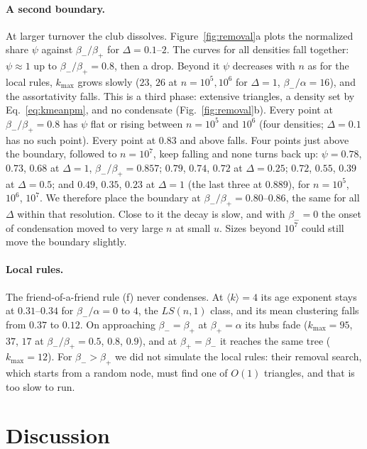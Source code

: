 \documentclass[aps,pre,twocolumn,superscriptaddress,floatfix,nofootinbib]{revtex4-2}
\begin{document}
\paragraph*{A second boundary.}
At larger turnover the club dissolves. Figure~\ref{fig:removal}a plots the
normalized share $\psi$ against $\beta_-/\beta_+$ for $\Delta=0.1$--$2$. The
curves for all densities fall together: $\psi\approx1$ up to
$\beta_-/\beta_+=0.8$, then a drop. Beyond it $\psi$
decreases with $n$ as for the local rules, $k_{\max}$ grows slowly ($23$, $26$
at $n=10^5,10^6$ for $\Delta=1$, $\beta_-/\alpha=16$), and the assortativity
falls. This is a third phase: extensive triangles, a density set by
Eq.~\eqref{eq:kmeanpm}, and no condensate (Fig.~\ref{fig:removal}b). Every point at $\beta_-/\beta_+=0.8$ has $\psi$ flat or rising
between $n=10^5$ and $10^6$ (four densities; $\Delta=0.1$ has no such point). Every point at $0.83$ and
above falls. Four points just above the boundary, followed to $n=10^7$, keep
falling and none turns back up: $\psi=0.78$, $0.73$, $0.68$ at $\Delta=1$,
$\beta_-/\beta_+=0.857$; $0.79$, $0.74$, $0.72$ at $\Delta=0.25$; $0.72$, $0.55$,
$0.39$ at $\Delta=0.5$; and $0.49$, $0.35$, $0.23$ at $\Delta=1$ (the last three at
$0.889$), for $n=10^5$, $10^6$, $10^7$. We therefore place the boundary at
$\beta_-/\beta_+=0.80$--$0.86$, the same for all $\Delta$ within that resolution.
Close to it the decay is slow, and with $\beta_-=0$ the onset of condensation
moved to very large $n$ at small $u$. Sizes beyond $10^7$ could still move the
boundary slightly.

\paragraph*{Local rules.}
The friend-of-a-friend rule (f) never condenses. At $\langle k\rangle=4$ its age
exponent stays at $0.31$--$0.34$ for $\beta_-/\alpha=0$ to $4$, the $LS(n,1)$
class, and its mean clustering falls from $0.37$ to $0.12$. On approaching
$\beta_-=\beta_+$ at $\beta_+=\alpha$ its hubs fade ($k_{\max}=95$, $37$, $17$
at $\beta_-/\beta_+=0.5$, $0.8$, $0.9$), and at $\beta_+=\beta_-$ it reaches
the same tree ($k_{\max}=12$). For $\beta_->\beta_+$ we did not simulate the
local rules: their removal search, which starts from a random node, must find
one of $O(1)$ triangles, and that is too slow to run.

\section{Discussion}
\end{document}
